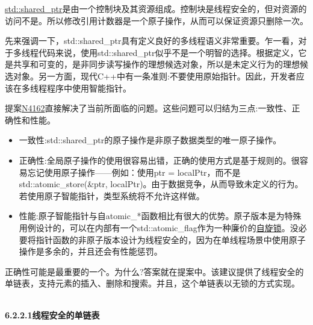 
\href{https://en.cppreference.com/w/cpp/memory/shared_ptr}{std::shared\_ptr}是由一个控制块及其资源组成。控制块是线程安全的，但对资源的访问不是。所以修改引用计数器是一个原子操作，从而可以保证资源只删除一次。

\begin{tcolorbox}[breakable,enhanced jigsaw,colback=blue!5!white,colframe=blue!75!black,title={线程安全的重要性}]
	
先来强调一下，std::shared\_ptr具有定义良好的多线程语义非常重要。乍一看，对于多线程代码来说，使用std::shared\_ptr似乎不是一个明智的选择。根据定义，它是共享和可变的，是非同步读写操作的理想候选对象，所以是未定义行为的理想候选对象。另一方面，现代C++中有一条准则:不要使用原始指针。因此，开发者应该在多线程程序中使用智能指针。
	
\end{tcolorbox}

提案\href{http://wg21.link/n4162}{N4162}直接解决了当前所面临的问题。这些问题可以归结为三点:一致性、正确性和性能。

\begin{itemize}
\item 
一致性:std::shared\_ptr的原子操作是非原子数据类型的唯一原子操作。

\item 
正确性:全局原子操作的使用很容易出错，正确的使用方式是基于规则的。很容易忘记使用原子操作——例如：使用ptr = localPtr，而不是std::atomic\_store(\&ptr, localPtr)。由于数据竞争，从而导致未定义的行为。若使用原子智能指针，类型系统将不允许这样做。

\item 
性能:原子智能指针与自atomic\_*函数相比有很大的优势。原子版本是为特殊用例设计的，可以在内部有一个std::atomic\_flag作为一种廉价的\href{https://en.wikipedia.org/wiki/Spinlock}{自旋锁}。没必要将指针函数的非原子版本设计为线程安全的，因为在单线程场景中使用原子操作是多余的，并且还会有性能惩罚。
\end{itemize}

正确性可能是最重要的一个。为什么?答案就在提案中。该建议提供了线程安全的单链表，支持元素的插入、删除和搜索。并且，这个单链表以无锁的方式实现。

\hspace*{\fill} \\ %
\noindent
\textbf{6.2.2.1\hspace{0.2cm}线程安全的单链表}

